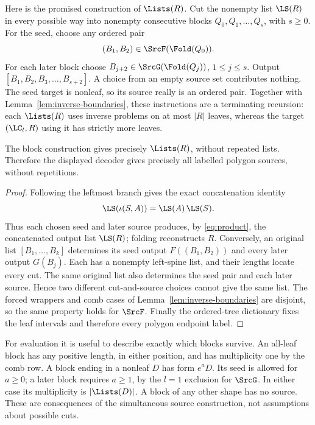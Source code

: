 Here is the promised construction of \(\Lists(R)\). Cut the nonempty
list \(\LS(R)\) in every possible way into nonempty consecutive blocks
\(Q_0,Q_1,\ldots,Q_s\), with \(s\ge0\).
For the seed, choose any ordered pair
\[
 (B_1,B_2)\in\SrcF(\Fold(Q_0)).
\]
For each later block choose
\(B_{j+2}\in\SrcG(\Fold(Q_j))\), \(1\le j\le s\).
Output \([B_1,B_2,B_3,\ldots,B_{s+2}]\).
A choice from an empty source set contributes nothing.
The seed target is nonleaf, so its source really is an ordered pair.
Together with Lemma~\ref{lem:inverse-boundaries}, these instructions
are a terminating recursion: each \(\Lists(R)\) uses inverse problems on
at most \(|R|\) leaves, whereas the target \((\LC_l,R)\) using it
has strictly more leaves.

\begin{proposition}\label{prop:parser}
The block construction gives precisely \(\Lists(R)\), without repeated
lists. Therefore the displayed decoder gives precisely all labelled
polygon sources, without repetitions.
\end{proposition}

\begin{proof}
Following the leftmost branch gives the exact concatenation identity
\[
 \LS(\iota(S,A))=\LS(A)\,\LS(S).
\]
Thus each chosen seed and later source produces, by \eqref{eq:product},
the concatenated output list \(\LS(R)\); folding reconstructs \(R\).
Conversely, an original list \([B_1,\ldots,B_k]\) determines its seed
output \(F((B_1,B_2))\) and every later output \(G(B_j)\).
Each has a nonempty left-spine list, and their lengths locate every cut.
The same original list also determines the seed pair and each later
source. Hence two different cut-and-source choices cannot give the same
list. The forced wrappers and comb cases of
Lemma~\ref{lem:inverse-boundaries} are disjoint, so the same property holds
for \(\SrcF\). Finally the ordered-tree dictionary fixes the leaf intervals
and therefore every polygon endpoint label.
\end{proof}

For evaluation it is useful to describe exactly which blocks survive.
An all-leaf block has any positive length, in either position, and has
multiplicity one by the comb row. A block ending in a nonleaf \(D\) has
form \(e^aD\). Its seed is allowed for \(a\ge0\); a later block requires
\(a\ge1\), by the \(l=1\) exclusion for \(\SrcG\).
In either case its multiplicity is \(|\Lists(D)|\).
A block of any other shape has no source. These are consequences of the
simultaneous source construction, not assumptions about possible cuts.
